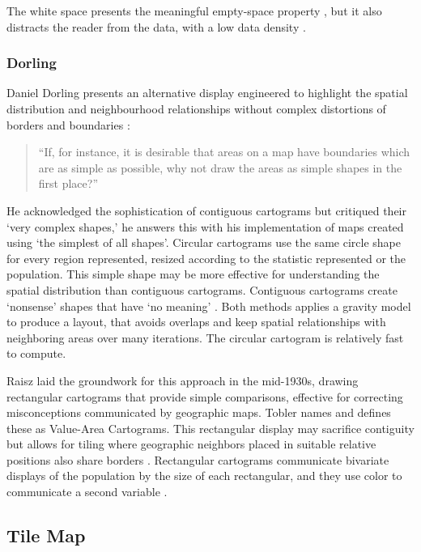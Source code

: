 \documentclass{monashthesis}
\begin{document}
The white space presents the meaningful empty-space property \autocite{ECGC}, \autocite{NAC} but it also distracts the reader from the data, with a low data density \autocite{TVSSS}.

\hypertarget{dorling}{%
\subsubsection{Dorling}\label{dorling}}

Daniel Dorling presents an alternative display engineered to highlight the spatial distribution and neighbourhood relationships without complex distortions of borders and boundaries \autocite{ACTUC}:

\begin{quote}
``If, for instance, it is desirable that areas on a map have boundaries which are as simple as possible, why not draw the areas as simple shapes in the first place?''
\end{quote}

He acknowledged the sophistication of contiguous cartograms but critiqued their `very complex shapes,' he answers this with his implementation of maps created using `the simplest of all shapes'. Circular cartograms use the same circle shape for every region represented, resized according to the statistic represented or the population. This simple shape may be more effective for understanding the spatial distribution than contiguous cartograms. Contiguous cartograms create `nonsense' shapes that have `no meaning' \autocite{NISCC}. Both methods applies a gravity model to produce a layout, that avoids overlaps and keep spatial relationships with neighboring areas over many iterations. The circular cartogram is relatively fast to compute.

Raisz \autocite{RSCW} laid the groundwork for this approach in the mid-1930s, drawing rectangular cartograms that provide simple comparisons, effective for correcting misconceptions communicated by geographic maps. Tobler \autocite{TFYCC} names and defines these as Value-Area Cartograms. This rectangular display may sacrifice contiguity but allows for tiling where geographic neighbors placed in suitable relative positions also share borders \autocite{CDWCS}. Rectangular cartograms communicate bivariate displays of the population by the size of each rectangular, and they use color to communicate a second variable \autocite{ORC}.

\hypertarget{tile-map}{%
\subsection{Tile Map}\label{tile-map}}
\end{document}
